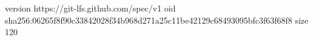 version https://git-lfs.github.com/spec/v1
oid sha256:06265f8f90c33842028f34b968d271a25c11be42129c68493095bfc3f63f68f8
size 120
